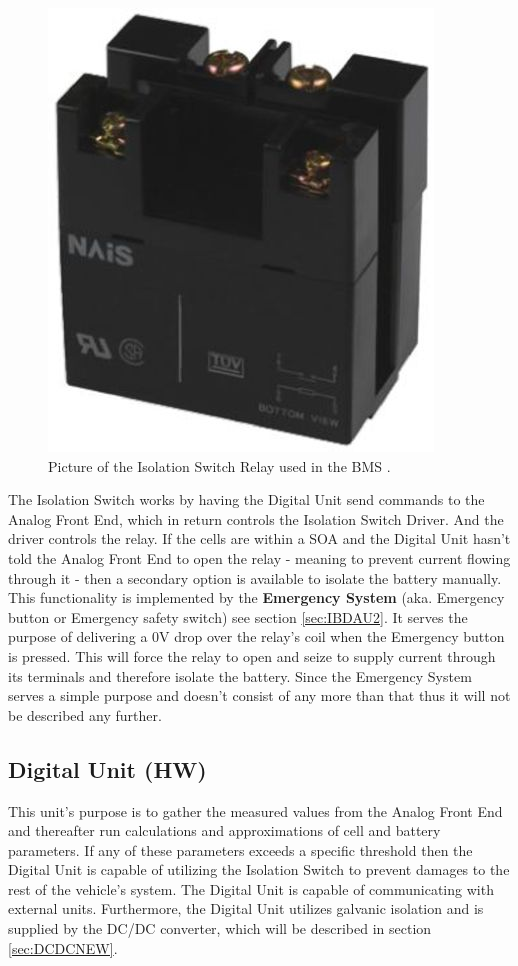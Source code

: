 \begin{figure}[H]
	\centering
	\includegraphics[width=0.3\linewidth]{Hardware/Pictures/BMSRelay}
	\caption[Empty]{Picture of the Isolation Switch Relay used in the BMS \cite{IsolationSwitchOnline}.}
	\label{fig:BMSRelay}
\end{figure}

The Isolation Switch works by having the Digital Unit send commands to the Analog Front End, which in return controls the Isolation Switch Driver. And the driver controls the relay. If the cells are within a SOA and the Digital Unit hasn't told the Analog Front End to open the relay - meaning to prevent current flowing through it - then a secondary option is available to isolate the battery manually. This functionality is implemented by the \textbf{Emergency System} (aka. Emergency button or Emergency safety switch) see section \vref{sec:IBDAU2}. It serves the purpose of delivering a 0V drop over the relay's coil when the Emergency button is pressed. This will force the relay to open and seize to supply current through its terminals and therefore isolate the battery. Since the Emergency System serves a simple purpose and doesn't consist of any more than that thus it will not be described any further.

\subsection{Digital Unit (HW)}
\label{sec:BMSDigUnit}
This unit's purpose is to gather the measured values from the Analog Front End and thereafter run calculations and approximations of cell and battery parameters. If any of these parameters exceeds a specific threshold then the Digital Unit is capable of utilizing the Isolation Switch to prevent damages to the rest of the vehicle's system. The Digital Unit is capable of communicating with external units. Furthermore, the Digital Unit utilizes galvanic isolation and is supplied by the DC/DC converter, which will be described in section \vref{sec:DCDCNEW}.

